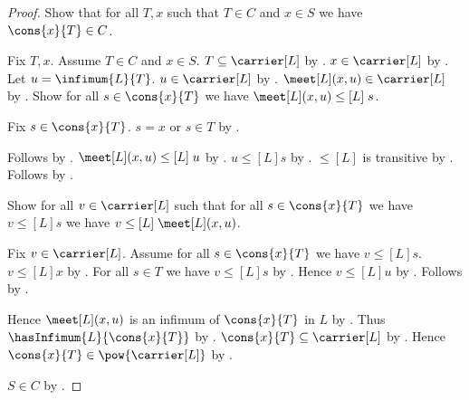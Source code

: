 \begin{proof}
    Show that for all $T,x$ such that $T\in C$ and $x\in S$ we have
        $\cons{x}{T}\in C$.
    \begin{subproof}
        Fix $T,x$.
        Assume $T\in C$ and $x\in S$.
        $T\subseteq\carrier[L]$ by .
        $x\in\carrier[L]$ by .
        Let $u=\infimum{L}{T}$.
        $u\in\carrier[L]$ by .
        $\meet[L](x,u)\in\carrier[L]$ by
            .
        Show for all $s\in\cons{x}{T}$ we have
            $\meet[L](x,u)\mathrel{\leq[L]}s$.
        \begin{subproof}
            Fix $s\in\cons{x}{T}$.
            $s=x$ or $s\in T$ by .
            \begin{byCase}
                Follows by
                    .
                $\meet[L](x,u)\mathrel{\leq[L]}u$ by
                    .
                $u\mathrel{\leq[L]}s$ by .
                $\leq[L]$ is transitive by
                    .
                Follows by .
            \end{byCase}
        \end{subproof}
        Show for all $v\in\carrier[L]$ such that
            for all $s\in\cons{x}{T}$ we have $v\mathrel{\leq[L]}s$
            we have $v\mathrel{\leq[L]}\meet[L](x,u)$.
        \begin{subproof}
            Fix $v\in\carrier[L]$.
            Assume for all $s\in\cons{x}{T}$ we have
                $v\mathrel{\leq[L]}s$.
            $v\mathrel{\leq[L]}x$ by .
            For all $s\in T$ we have $v\mathrel{\leq[L]}s$ by
                .
            Hence $v\mathrel{\leq[L]}u$ by .
            Follows by
                .
        \end{subproof}
        Hence $\meet[L](x,u)$ is an infimum of $\cons{x}{T}$ in $L$ by
            .
        Thus $\hasInfimum{L}{\cons{x}{T}}$ by
            .
        $\cons{x}{T}\subseteq\carrier[L]$ by
            .
        Hence $\cons{x}{T}\in\pow{\carrier[L]}$ by
            .
    \end{subproof}
    $S\in C$ by .
\end{proof}

